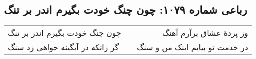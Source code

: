 \begin{center}
\section*{رباعی شماره ۱۰۷۹: چون چنگ خودت بگیرم اندر بر تنگ}
\label{sec:1079}
\begin{longtable}{l p{0.5cm} r}
چون چنگ خودت بگیرم اندر بر تنگ
&&
وز پردهٔ عشاق برآرم آهنگ
\\
گر زانکه در آبگینه خواهی زد سنگ
&&
در خدمت تو بیایم اینک من و سنگ
\\
\end{longtable}
\end{center}
